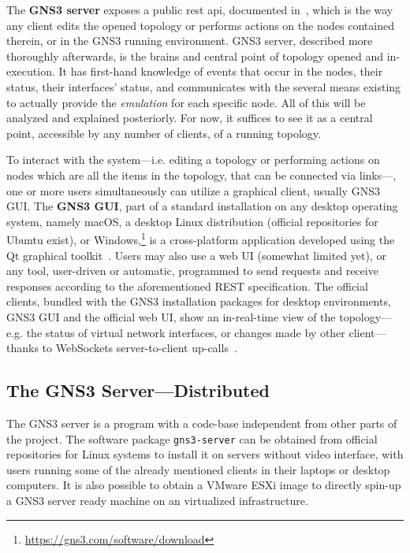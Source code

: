 The \textbf{GNS3 server} exposes a public \acrshort{rest} \acrshort{api}, documented in~\cite{gns3devarch}, which is the way any client edits the opened topology or performs actions on the nodes contained therein, or in the GNS3 running environment.
GNS3 server, described more thoroughly afterwards, is the brains and central point of topology opened and in-execution.
It has first-hand knowledge of events that occur in the nodes, their status, their interfaces' status, and communicates with the several means existing to actually provide the \emph{emulation} for each specific node.
All of this will be analyzed and explained posteriorly.
For now, it suffices to see it as a central point, accessible by any number of clients, of a running topology.

To interact with the system---i.e. editing a topology or performing actions on nodes which are all the items in the topology, that can be connected via links---, one or more users simultaneously can utilize a graphical client, usually GNS3 GUI. The \textbf{GNS3 GUI}, part of a standard installation on any desktop operating system, namely macOS, a desktop Linux distribution (official repositories for Ubuntu exist), or Windows,\footnote{\url{https://gns3.com/software/download}} is a cross-platform application developed using the Qt graphical toolkit~\cite{qttoolkit}.
Users may also use a web UI (somewhat limited yet), or any tool, user-driven or automatic, programmed to send requests and receive responses according to the aforementioned REST specification.
The official clients, bundled with the GNS3 installation packages for desktop environments, GNS3 GUI and the official web UI, show an in-real-time view of the topology---e.g. the status of virtual network interfaces, or changes made by other client---thanks to WebSockets server-to-client up-calls~\cite{ytgns3arch22}. %



\subsection{The GNS3 Server---Distributed}
\label{subsec:gns3serverindetail}

The GNS3 server is a program with a code-base independent from other parts of the project.
The software package \texttt{gns3-server} can be obtained from official repositories for Linux systems to install it on servers without video interface, with users running some of the already mentioned clients in their laptops or desktop computers.
It is also possible to obtain a VMware ESXi image to directly spin-up a GNS3 server ready machine on an virtualized infrastructure.

